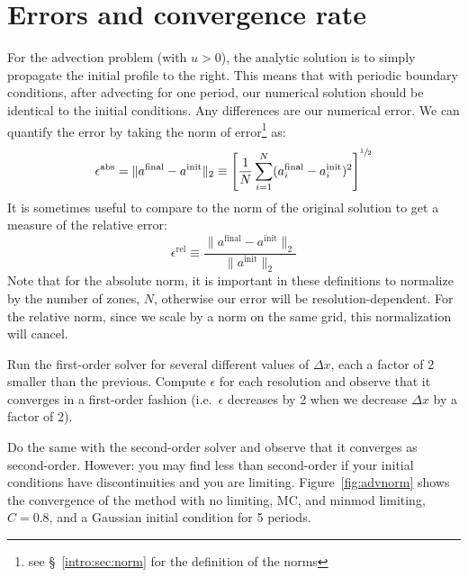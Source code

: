 \section{Errors and convergence rate}

For the advection problem (with $u>0$), the analytic solution is to
simply propagate the initial profile to the right.  This means that
with periodic boundary conditions, after advecting for one period, our
numerical solution should be identical to the initial conditions.  Any
differences are our numerical error.  We can quantify the error by
taking the norm of error\footnote{see \S~\ref{intro:sec:norm} for the
  definition of the norms} as:
\begin{equation}
\epsilon^\mathrm{abs} = \| a^\mathrm{final} - a^\mathrm{init} \|_2 \equiv
   \left [ \frac{1}{N} \sum_{i=1}^N 
   ( a_i^\mathrm{final} - a_i^\mathrm{init} )^2
  \right ]^{{\sfrac{1}{2}}}
\end{equation}
It is sometimes useful to compare to the norm of the original solution
to get a measure of the relative error:
\begin{equation}
\epsilon^\mathrm{rel} \equiv \frac{\| a^\mathrm{final} - a^\mathrm{init} \|_2}
   {\| a^\mathrm{init} \|_2}
\end{equation}
Note that for the absolute norm, it is important in these definitions
to normalize by the number of zones, $N$, otherwise our error will be
resolution-dependent.  For the relative norm, since we scale by a norm
on the same grid, this normalization will cancel.
%
\begin{exercise}
{ Run the first-order solver for several different values of $\Delta x$,
each a factor of 2 smaller than the previous.  Compute $\epsilon$ for
each resolution and observe that it converges in a first-order fashion
(i.e.\ $\epsilon$ decreases by 2 when we decrease $\Delta x$ by a factor of 2).

\noindent Do the same with the second-order solver and observe that it
converges as second-order. However: you may find less than
second-order if your initial conditions have discontinuities and you
are limiting.  Figure~\ref{fig:advnorm} shows the convergence of the
method with no limiting, MC, and minmod limiting, $C = 0.8$, and a
Gaussian initial condition for 5 periods.}
\end{exercise}

